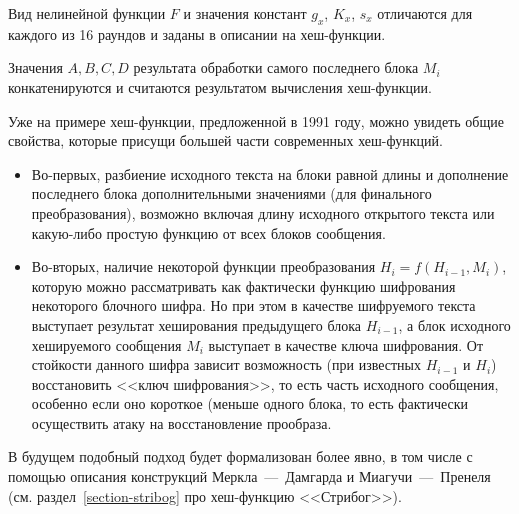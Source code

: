 Вид нелинейной функции $F$ и значения констант $g_x$, $K_x$, $s_x$ отличаются для каждого из 16 раундов и заданы в описании на хеш-функции. 

Значения $A, B, C, D$ результата обработки самого последнего блока $M_i$ конкатенируются и считаются результатом вычисления хеш-функции.

Уже на примере хеш-функции, предложенной в 1991 году, можно увидеть общие свойства, которые присущи большей части современных хеш-функций.

\begin{itemize}
  \item Во-первых, разбиение исходного текста на блоки равной длины и дополнение последнего блока дополнительными значениями (для финального преобразования), возможно включая длину исходного открытого текста или какую-либо простую функцию от всех блоков сообщения.
  \item Во-вторых, наличие некоторой функции преобразования $H_i = f ( H_{i-1}, M_i )$, которую можно рассматривать как фактически функцию шифрования некоторого блочного шифра. Но при этом в качестве шифруемого текста выступает результат хеширования предыдущего блока $H_{i-1}$, а блок исходного хешируемого сообщения $M_i$ выступает в качестве ключа шифрования. От стойкости данного шифра зависит возможность (при известных $H_{i-1}$ и $H_{i}$) восстановить <<ключ шифрования>>, то есть часть исходного сообщения, особенно если оно короткое (меньше одного блока, то есть фактически осуществить атаку на восстановление прообраза.
\end{itemize}

В будущем подобный подход будет формализован более явно, в том числе с помощью описания конструкций Меркла~---~Дамгарда и Миагучи~---~Пренеля (см. раздел~\ref{section-stribog} про хеш-функцию <<Стрибог>>).

